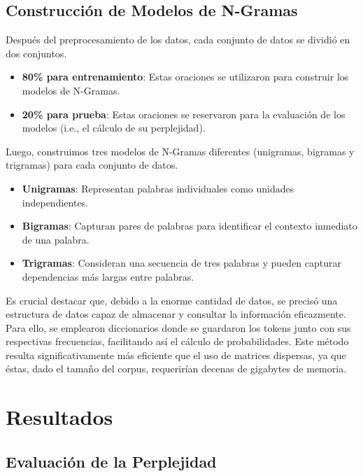 \documentclass[11pt,english]{article}
\theoremstyle{plain}
\begin{document}
\subsection{Construcción de Modelos de N-Gramas}

Después del preprocesamiento de los datos, cada conjunto de datos se dividió en dos conjuntos.

\begin{itemize}
    \item \textbf{80\% para entrenamiento}: Estas oraciones se utilizaron para construir los modelos de N-Gramas.
    \item \textbf{20\% para prueba}: Estas oraciones se reservaron para la evaluación de los modelos (i.e., el cálculo de su perplejidad).
\end{itemize}

\noindent Luego, construimos tres modelos de N-Gramas diferentes (unigramas, bigramas y trigramas) para cada conjunto de datos.

\begin{itemize}
    \item \textbf{Unigramas}: Representan palabras individuales como unidades independientes.
    \item \textbf{Bigramas}: Capturan pares de palabras para identificar el contexto inmediato de una palabra.
    \item \textbf{Trigramas}: Consideran una secuencia de tres palabras y pueden capturar dependencias más largas entre palabras.
\end{itemize}

Es crucial destacar que, debido a la enorme cantidad de datos, se precisó una estructura de datos capaz de almacenar y consultar la información eficazmente. Para ello, se emplearon diccionarios donde se guardaron los tokens junto con sus respectivas frecuencias, facilitando así el cálculo de probabilidades. Este método resulta significativamente más eficiente que el uso de matrices dispersas, ya que éstas, dado el tamaño del corpus, requerirían decenas de gigabytes de memoria.

\section{Resultados}

\subsection{Evaluación de la Perplejidad}
\end{document}

